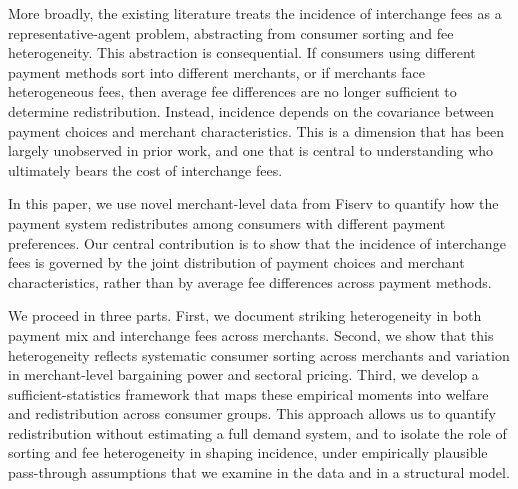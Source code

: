\documentclass[main.tex]{subfiles}
\begin{document}
More broadly, the existing literature treats the incidence of interchange fees as a representative-agent problem, abstracting from consumer sorting and fee heterogeneity. This abstraction is consequential. If consumers using different payment methods sort into different merchants, or if merchants face heterogeneous fees, then average fee differences are no longer sufficient to determine redistribution. 
Instead, incidence depends on the covariance between payment choices and merchant characteristics. 
This is a dimension that has been largely unobserved in prior work, and one that is central to understanding who ultimately bears the cost of interchange fees.

In this paper, we use novel merchant-level data from Fiserv to quantify how the payment system redistributes among consumers with different payment preferences.
Our central contribution is to show that the incidence of interchange fees is governed by the joint distribution of payment choices and merchant characteristics, rather than by average fee differences across payment methods.

We proceed in three parts.
First, we document striking heterogeneity in both payment mix and interchange fees across merchants.
Second, we show that this heterogeneity reflects systematic consumer sorting across merchants and variation in merchant-level bargaining power and sectoral pricing. 
Third, we develop a sufficient-statistics framework that maps these empirical moments into welfare and redistribution across consumer groups. 
This approach allows us to quantify redistribution without estimating a full demand system, and to isolate the role of sorting and fee heterogeneity in shaping incidence, under empirically plausible pass-through assumptions that we examine in the data and in a structural model.
\end{document}

